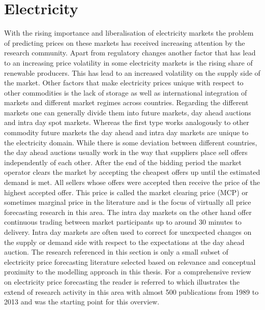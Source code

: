 \section{Electricity}
With the rising importance and liberalisation of electricity markets the problem of predicting prices on these markets has received increasing attention by the research community. Apart from regulatory changes another factor that has lead to an increasing price volatility in some electricity markets is the rising share of renewable producers. This has lead to an increased volatility on the supply side of the market. Other factors that make electricity prices unique with respect to other commodities is the lack of storage as well as international integration of markets and different market regimes across countries. Regarding the different markets one can generally divide them into future markets, day ahead auctions and intra day spot markets. Whereas the first type works analogously to other commodity future markets the day ahead and intra day markets are unique to the electricity domain. While there is some deviation between different countries, the day ahead auctions usually work in the way that suppliers place sell offers independently of each other. After the end of the bidding period the market operator clears the market by accepting the cheapest offers up until the estimated demand is met. All sellers whose offers were accepted then receive the price of the highest accepted offer. This price is called the market clearing price (MCP) or sometimes marginal price in the literature and is the focus of virtually all price forecasting research in this area. The intra day markets on the other hand offer continuous trading between market participants up to around 30 minutes to delivery. Intra day markets are often used to correct for unexpected changes on the supply or demand side with respect to the expectations at the day ahead auction. The research referenced in this section is only a small subset of electricity price forecasting literature selected based on relevance and conceptual proximity to the modelling approach in this thesis.
For a comprehensive review on electricity price forecasting the reader is referred to \textit{\cite{weron_electricity_2014}} which illustrates the extend of research activity in this area with almost 500 publications from 1989 to 2013 and was the starting point for this overview.
